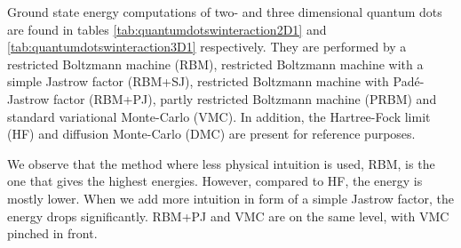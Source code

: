 Ground state energy computations of two- and three dimensional quantum dots are found in tables \eqref{tab:quantumdotswinteraction2D1} and \eqref{tab:quantumdotswinteraction3D1} respectively. They are performed by a restricted Boltzmann machine (RBM), restricted Boltzmann machine with a simple Jastrow factor (RBM+SJ), restricted Boltzmann machine with Padé-Jastrow factor (RBM+PJ), partly restricted Boltzmann machine (PRBM) and standard variational Monte-Carlo (VMC). In addition, the Hartree-Fock limit (HF) and diffusion Monte-Carlo (DMC) are present for reference purposes. 

We observe that the method where less physical intuition is used, RBM, is the one that gives the highest energies. However, compared to HF, the energy is mostly lower. When we add more intuition in form of a simple Jastrow factor, the energy drops significantly. RBM+PJ and VMC are on the same level, with VMC pinched in front.

